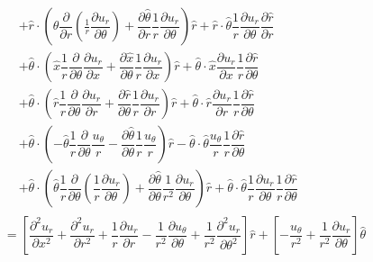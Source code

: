 \documentclass{kthreport}
\begin{document}
\begin{eqnarray}
\begin{split}
	&+ \hat{r}\cdot\left(\hat{\theta}\dfrac{\partial }{\partial r}\left(\frac{1}{r}\dfrac{\partial u_{r}}{\partial \theta}\right) + \dfrac{\partial \hat{\theta}}{\partial r}\dfrac{1}{r}\dfrac{\partial u_{r}}{\partial \theta} \right)\hat{r} + \hat{r}\cdot\hat{\theta}\dfrac{1}{r}\dfrac{\partial u_{r}}{\partial \theta}\dfrac{\partial \hat{r}}{\partial r}\\
	&+ \hat{\theta}\cdot\left(\hat{x}\dfrac{1}{r}\dfrac{\partial }{\partial \theta}\dfrac{\partial u_{r}}{\partial x}  + \dfrac{\partial \hat{x}}{\partial \theta}\dfrac{1}{r}\dfrac{\partial u_{r}}{\partial x} \right)\hat{r} + \hat{\theta}\cdot\hat{x}\dfrac{\partial u_{r}}{\partial x}\dfrac{1}{r}\dfrac{\partial \hat{r}}{\partial \theta} \\
	&+ \hat{\theta}\cdot\left(	\hat{r}\dfrac{1}{r}\dfrac{\partial}{\partial \theta}\dfrac{\partial u_{r}}{\partial r}	+ \dfrac{\partial \hat{r}}{\partial \theta}\dfrac{1}{r}\dfrac{\partial u_{r}}{\partial r} \right)\hat{r} + \hat{\theta}\cdot\hat{r}\dfrac{\partial u_{r}}{\partial r}\dfrac{1}{r}\dfrac{\partial \hat{r}}{\partial \theta} \\
	& + \hat{\theta}\cdot\left( -\hat{\theta}\dfrac{1}{r}\dfrac{\partial }{\partial \theta}\dfrac{u_{\theta}}{r}	- \dfrac{\partial \hat{\theta}}{\partial \theta}\dfrac{1}{r}\dfrac{u_{\theta}}{r}  \right)\hat{r}  - \hat{\theta}\cdot\hat{\theta}\dfrac{u_{\theta}}{r}\dfrac{1}{r}\dfrac{\partial \hat{r}}{\partial \theta} \\
	&+ \hat{\theta}\cdot\left(\hat{\theta}\dfrac{1}{r}\dfrac{\partial }{\partial \theta}\left(\dfrac{1}{r}\dfrac{\partial u_{r}}{\partial \theta}\right)
	+ \dfrac{\partial \hat{\theta}}{\partial \theta}\dfrac{1}{r^{2}}\dfrac{\partial u_{r}}{\partial \theta} \right) \hat{r} + \hat{\theta}\cdot\hat{\theta}\dfrac{1}{r}\dfrac{\partial u_{r}}{\partial \theta}\dfrac{1}{r}\dfrac{\partial \hat{r}}{\partial \theta}
\end{split} \nonumber \\
%
= \left[\dfrac{\partial^{2}u_{r}}{\partial x^{2}} + \dfrac{\partial^{2}u_{r}}{\partial r^{2}} + \dfrac{1}{r}\dfrac{\partial u_{r}}{\partial r} - \dfrac{1}{r^{2}}\dfrac{\partial u_{\theta}}{\partial \theta} +\dfrac{1}{r^{2}}\dfrac{\partial^{2} u_{r}}{\partial \theta^{2}} 	\right]\hat{r}  + \left[- \dfrac{u_{\theta}}{r^{2}} + \dfrac{1}{r^{2}}\dfrac{\partial u_{r}}{\partial \theta}\right]\hat{\theta}
\end{eqnarray}
\end{document}
